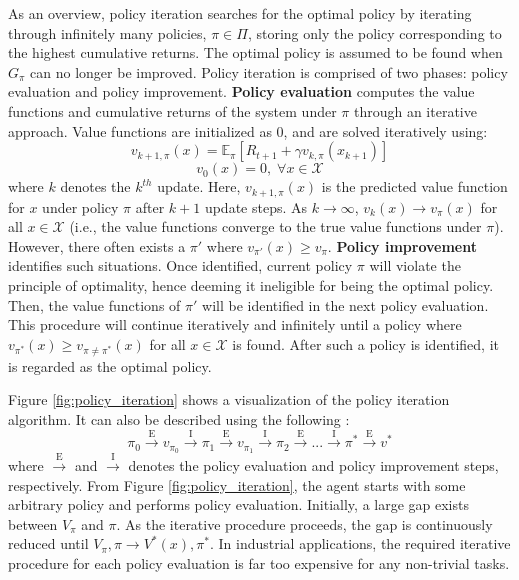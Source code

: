 As an overview, policy iteration searches for the optimal policy by iterating through infinitely many policies, $\pi \in \Pi$, storing only the policy corresponding to the highest cumulative returns.  The optimal policy is assumed to be found when $G_{\pi}$ can no longer be improved.  Policy iteration is comprised of two phases: policy evaluation and policy improvement. \textbf{Policy evaluation} computes the value functions and cumulative returns of the system under $\pi$ through an iterative approach. Value functions are initialized as 0, and are solved iteratively using:
\begin{equation}
    v_{k+1, \pi}(x) = \mathbb{E}_{\pi}[R_{t+1} + \gamma v_{k, \pi} (x_{k+1})]
\end{equation}
$$ v_0(x) = 0, \; \forall x \in \mathcal{X}$$
where $k$ denotes the $k^{th}$ update.  Here, $v_{k+1, \pi}(x)$ is the predicted value function for $x$ under policy $\pi$ after $k+1$ update steps.  As $k \rightarrow \infty$, $v_{k}(x) \rightarrow v_{\pi}(x)$ for all $x \in \mathcal{X}$ (i.e., the value functions converge to the true value functions under $\pi$). However, there often exists a $\pi'$ where $v_{\pi'}(x) \geq v_{\pi}$.  \textbf{Policy improvement} identifies such situations.  Once identified, current policy $\pi$ will violate the principle of optimality, hence deeming it ineligible for being the optimal policy. Then, the value functions of $\pi'$ will be identified in the next policy evaluation. This procedure will continue iteratively and infinitely until a policy where $v_{\pi^*}(x) \geq v_{\pi \neq \pi^*}(x)$ for all $x \in \mathcal{X}$ is found. After such a policy is identified, it is regarded as the optimal policy.

Figure \ref{fig:policy_iteration} shows a visualization of the policy iteration algorithm.  It can also be described using the following \cite{sutton}:
\begin{equation}
    \pi_0 \xrightarrow{\text{E}} 
    v_{\pi_0} \xrightarrow{\text{I}} 
    \pi_1 \xrightarrow{\text{E}}
    v_{\pi_1} \xrightarrow{\text{I}} 
    \pi_2 \xrightarrow{\text{E}} ... \xrightarrow{\text{I}} 
    \pi^* \xrightarrow{\text{E}}  v^*
\end{equation}
where $\xrightarrow{\text{E}}$ and $\xrightarrow{\text{I}}$ denotes the policy evaluation and policy improvement steps, respectively. From Figure \ref{fig:policy_iteration}, the agent starts with some arbitrary policy and performs policy evaluation. Initially, a large gap exists between $V_{\pi}$ and $\pi$.  As the iterative procedure proceeds, the gap is continuously reduced until $V_{\pi}, \pi \rightarrow V^*(x), \pi^*$. In industrial applications, the required iterative procedure for each policy evaluation is far too expensive for any non-trivial tasks.


